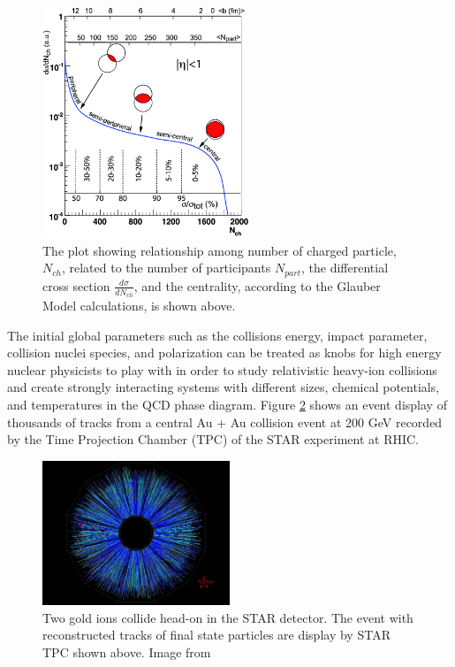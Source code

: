 \begin{figure}[hbtp]
\begin{center}
\includegraphics[width=0.55\textwidth]{Figures/Chapter1/CentDefPlot.png}
\caption{The plot showing relationship among number of charged particle, $N_{ch}$, related to the number of participants $N_{part}$, the differential cross section $\frac{d\sigma}{dN_{ch}}$, and the centrality, according to the Glauber Model calculations, is shown above.}
\label{CentDefPlot}
\end{center}
\end{figure} 


The initial global parameters such as the collisions energy, impact parameter, collision nuclei species, and polarization can be treated as knobs for high energy nuclear physicists to play with in order to study relativistic heavy-ion collisions and create strongly interacting systems with different sizes, chemical potentials, and temperatures in the QCD phase diagram. Figure \ref{STAREvtDisplay} shows an event display of thousands of tracks from a central Au + Au collision event at 200 GeV recorded by the Time Projection Chamber (TPC) of the STAR experiment at RHIC.


\begin{figure}[hbtp]
\begin{center}
\includegraphics[width=0.50\textwidth]{Figures/Chapter1/STAREvtDisplay.png}
\caption{Two gold ions collide head-on in the STAR detector. The event with reconstructed tracks of final state particles are display by STAR TPC shown above. Image from \cite{STARTPC}}
\label{STAREvtDisplay}
\end{center}
\end{figure} 



